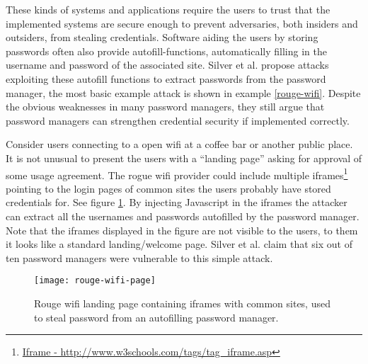 These kinds of systems and applications require the users to trust that the implemented systems are secure enough to prevent adversaries, both insiders and outsiders, from stealing credentials. Software aiding the users by storing passwords often also provide autofill-functions, automatically filling in the username and password of the associated site. Silver et al. \cite{pw-managment-attacks} propose attacks exploiting these autofill functions to extract passwords from the password manager, the most basic example attack is shown in example \ref{rouge-wifi}. Despite the obvious weaknesses in many password managers, they still argue that password managers can strengthen credential security if implemented correctly.  
\begin{example}\label{rouge-wifi}
    Consider users connecting to a open wifi at a coffee bar or another public place. It is not unusual to present the users with a ``landing page'' asking for approval of some usage agreement. The rogue wifi provider could include multiple iframes\footnote{\url{Iframe - http://www.w3schools.com/tags/tag_iframe.asp}} pointing to the login pages of common sites the users probably have stored credentials for. See figure \ref{rouge-wifi-page}. By injecting Javascript in the iframes the attacker can extract all the usernames and passwords autofilled by the password manager. Note that the iframes displayed in the figure are not visible to the users, to them it looks like a standard landing/welcome page. Silver et al. \cite{pw-managment-attacks} claim that six out of ten password managers were vulnerable to this simple attack.


\begin{figure}
    \texttt{[image: rouge-wifi-page]}
    \caption{Rouge wifi landing page containing iframes with common sites, used to steal password from an autofilling password manager.} 
    \label{rouge-wifi-page}
\end{figure}

\end{example}

